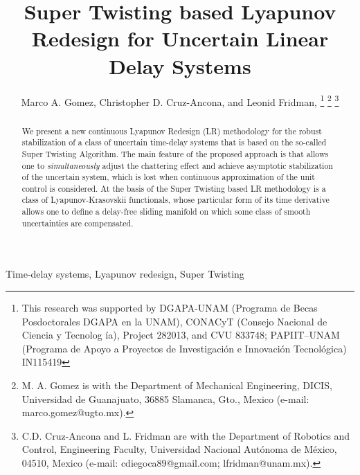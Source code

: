 \documentclass[onecolumn]{IEEEtran}
\begin{document}
\title{Super Twisting based  Lyapunov Redesign  for Uncertain Linear Delay Systems}
\author{Marco A. Gomez,  Christopher D.  Cruz-Ancona,  and Leonid Fridman, 
\thanks{This research was supported by DGAPA-UNAM (Programa de Becas Posdoctorales DGAPA en la UNAM), CONACyT (Consejo Nacional de Ciencia y Tecnolog \'ia), Project 282013, and CVU 833748; PAPIIT–UNAM (Programa de Apoyo a Proyectos de Investigaci\'on e Innovaci\'on Tecnol\'ogica) IN115419 }
\thanks{M. A. Gomez is with the Department of Mechanical Engineering, DICIS,  Universidad de Guanajuato, 36885 Slamanca, Gto., Mexico (e-mail: marco.gomez@ugto.mx). }
\thanks{C.D. Cruz-Ancona and L. Fridman are with the Department of Robotics and Control, Engineering Faculty, Universidad Nacional Aut\'onoma de M\'exico, 04510, Mexico (e-mail: cdiegoca89@gmail.com; lfridman@unam.mx).}
}

\maketitle

\begin{abstract}
We present a new continuous Lyapunov Redesign (LR)  methodology for the robust stabilization of  a class of uncertain time-delay systems that  is based on the so-called Super Twisting Algorithm. The main feature of the proposed approach is that allows one to \textit{simultaneously} adjust the chattering effect  and achieve asymptotic stabilization of the uncertain system, which is lost  when continuous approximation  of the unit control is considered. At the basis of the Super Twisting based LR methodology is a class of Lyapunov-Krasovskii functionals, {whose} particular form of its time derivative  allows one  to define a delay-free sliding manifold on which some class of smooth uncertainties are compensated. 
\end{abstract}

\begin{IEEEkeywords}
Time-delay systems, Lyapunov redesign,  Super Twisting
\end{IEEEkeywords}
\end{document}
